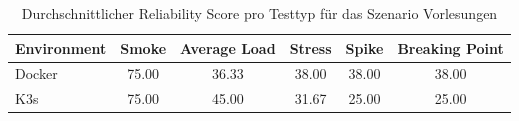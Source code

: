 \begin{table}[htbp]
\centering
\caption{Durchschnittlicher Reliability Score pro Testtyp für das Szenario Vorlesungen}
\label{tab:scenario_score_matrix_vorlesungen}

\begin{tabular}{lccccc}
\toprule
\textbf{Environment} & \textbf{Smoke} & \textbf{Average Load} & \textbf{Stress} & \textbf{Spike} & \textbf{Breaking Point} \\
\midrule
Docker & 75.00 & 36.33 & 38.00 & 38.00 & 38.00 \\
K3s    & 75.00 & 45.00 & 31.67 & 25.00 & 25.00 \\
\bottomrule
\end{tabular}

\end{table}

\FloatBarrier